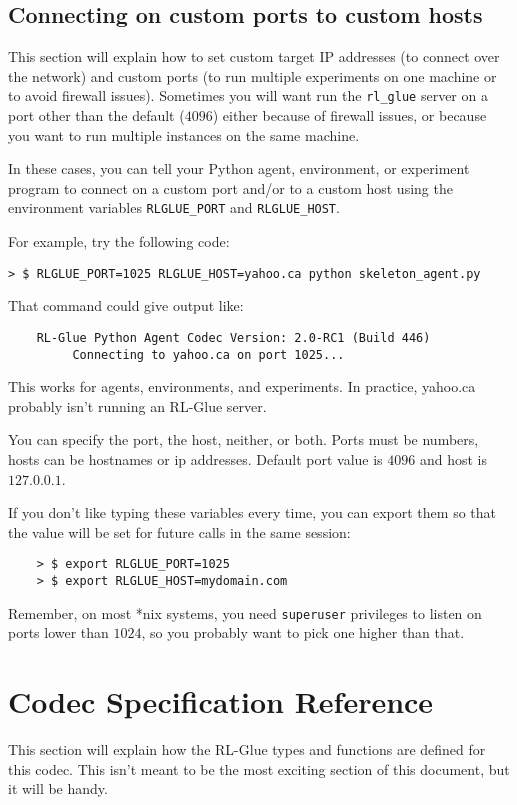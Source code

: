 \documentclass[11pt]{article}
\begin{document}
\subsection{Connecting on custom ports to custom hosts}
This section will explain how to set custom target IP addresses (to connect over the network) and custom ports (to run multiple experiments on one machine or to avoid firewall issues).
Sometimes you will want run the \texttt{rl\_glue} server on a port other than the default
($4096$) either because of firewall issues, or because you want to run multiple instances on the same machine.

In these cases, you can tell your Python agent, environment, or experiment program to connect on a custom port and/or to a custom host using the environment variables \texttt{RLGLUE\_PORT} and \texttt{RLGLUE\_HOST}.

For example, try the following code:
\begin{verbatim}
> $ RLGLUE_PORT=1025 RLGLUE_HOST=yahoo.ca python skeleton_agent.py
\end{verbatim}

That command could give output like:
\begin{verbatim}
	RL-Glue Python Agent Codec Version: 2.0-RC1 (Build 446)
	     Connecting to yahoo.ca on port 1025...
\end{verbatim}

This works for agents, environments, and experiments.  In practice, yahoo.ca probably isn't running an RL-Glue server.

You can specify the port, the host, neither, or both.  Ports must be numbers, hosts can be hostnames or ip addresses. Default port value is $4096$ and host is $127.0.0.1$.

If you don't like typing these variables every time, you can export them so that the value will be set for future
calls  in the same session:
\begin{verbatim}
	> $ export RLGLUE_PORT=1025
	> $ export RLGLUE_HOST=mydomain.com
\end{verbatim}

Remember, on most *nix systems, you need \texttt{superuser} privileges to listen on ports lower than $1024$, so you probably want to pick one higher than that.

\section{Codec Specification Reference}
This section will explain how the RL-Glue types and functions are defined for this codec.  This isn't meant to be the most exciting section of this document, but it will
be handy.
\end{document}
